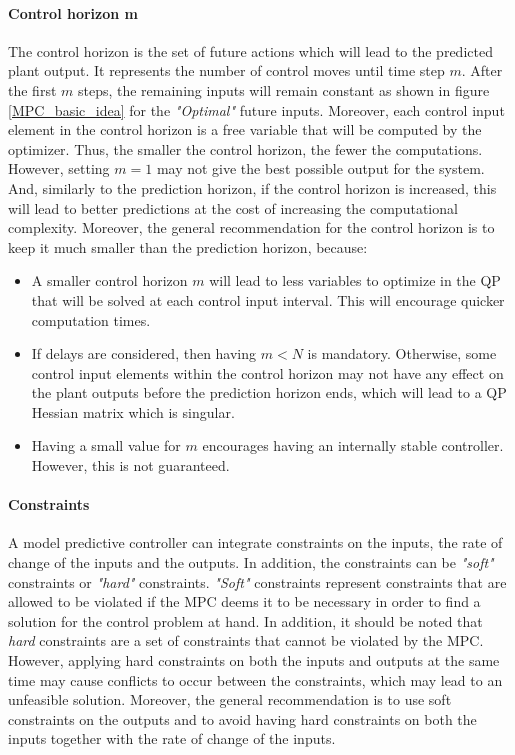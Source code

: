 \documentclass{thesisreport}
\begin{document}
\paragraph{Control horizon m}

The control horizon is the set of future actions which will lead to the predicted plant output. It represents the number of control moves until time step $m$. After the first $m$ steps, the remaining inputs will remain constant as shown in figure \ref{MPC_basic_idea} for the \textit{"Optimal"} future inputs. Moreover, each control input element in the control horizon is a free variable that will be computed by the optimizer. Thus, the smaller the control horizon, the fewer the computations. However, setting $m=1$ may not give the best possible output for the system. And, similarly to the prediction horizon, if the control horizon is increased, this will lead to better predictions at the cost of increasing the computational complexity. Moreover, the general recommendation for the control horizon is to keep it much smaller than the prediction horizon, because:

\begin{itemize}
	\item A smaller control horizon $m$ will lead to less variables to optimize in the QP that will be solved at each control input interval. This will encourage quicker computation times.
	\item If delays are considered, then having $m<N$ is mandatory. Otherwise, some control input elements within the control horizon  may not have any effect on the plant outputs before the prediction horizon ends, which will lead to a QP Hessian matrix which is singular. 
	\item Having a small value for $m$ encourages having an internally stable controller. However, this is not guaranteed.
\end{itemize}

\paragraph{Constraints} A model predictive controller can integrate constraints on the inputs, the rate of change of the inputs and the outputs. In addition, the constraints can be \textit{"soft"} constraints or \textit{"hard"} constraints. \textit{"Soft"} constraints represent constraints that are allowed to be violated if the MPC deems it to be necessary in order to find a solution for the control problem at hand.
In addition, it should be noted that \textit{hard} constraints are a set of constraints that cannot be violated by the MPC. However, applying hard constraints on both the inputs and outputs at the same time may cause conflicts to occur between the constraints, which may lead to an unfeasible solution. Moreover, the general recommendation is to use soft constraints on the outputs and to avoid having hard constraints on both the inputs together with the rate of change of the inputs.
\end{document}
